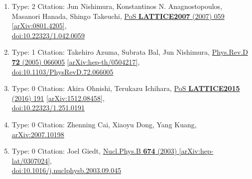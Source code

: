 \documentclass[a4paper,10pt]{article}
\begin{document}
\begin{enumerate}
\begin{enumerate}
  \item Type: 2 Citation: Jun Nishimura, Konstantinos N. Anagnostopoulos, Masanori Hanada, Shingo Takeuchi, \href{https://www.doi.org/10.22323/1.042.0059}{PoS {\bf LATTICE2007} (2007) 059}  \href{https://arxiv.org/abs/0801.4205}{[arXiv:0801.4205]},\\\href{https://www.doi.org/10.22323/1.042.0059}{doi:10.22323/1.042.0059}
  \item Type: 1 Citation: Takehiro Azuma, Subrata Bal, Jun Nishimura, \href{https://www.doi.org/10.1103/PhysRevD.72.066005}{Phys.Rev.D {\bf 72} (2005) 066005}  \href{https://arxiv.org/abs/hep-th/0504217}{[arXiv:hep-th/0504217]},\\\href{https://www.doi.org/10.1103/PhysRevD.72.066005}{doi:10.1103/PhysRevD.72.066005}
  \item Type: 0 Citation: Akira Ohnishi, Terukazu Ichihara, \href{https://www.doi.org/10.22323/1.251.0191}{PoS {\bf LATTICE2015} (2016) 191}  \href{https://arxiv.org/abs/1512.08458}{[arXiv:1512.08458]},\\\href{https://www.doi.org/10.22323/1.251.0191}{doi:10.22323/1.251.0191}
  \item Type: 0 Citation: Zhenning Cai, Xiaoyu Dong, Yang Kuang, \href{https://arxiv.org/abs/2007.10198}{arXiv:2007.10198}
  \item Type: 0 Citation: Joel Giedt, \href{https://www.doi.org/10.1016/j.nuclphysb.2003.09.045}{Nucl.Phys.B {\bf 674} (2003) }  \href{https://arxiv.org/abs/hep-lat/0307024}{[arXiv:hep-lat/0307024]},\\\href{https://www.doi.org/10.1016/j.nuclphysb.2003.09.045}{doi:10.1016/j.nuclphysb.2003.09.045}

\end{enumerate}
\end{enumerate}
\end{document}
